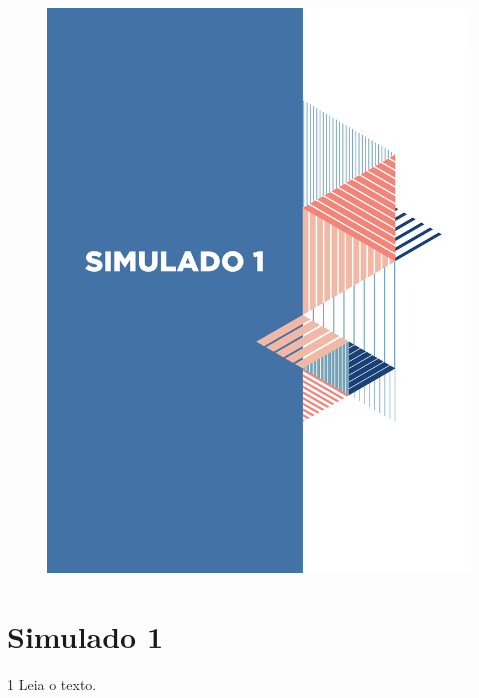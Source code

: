 \pagebreak

\mbox{}

\begin{figure}
\vspace*{-3cm}
\hspace*{-3.7cm}\includegraphics[scale=1]{../watermarks/1simulado9ano.pdf}
\end{figure}


\pagebreak

\section*{Simulado 1}

\num{1} Leia o texto.

